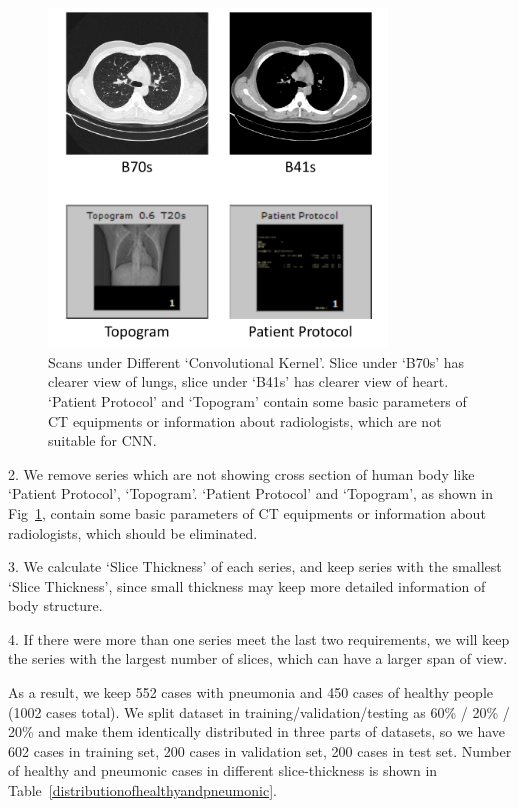 \documentclass[journal]{IEEEtran}
\begin{document}
\begin{figure}[t]
    \centerline{\includegraphics[width=90mm]{Bs.pdf}}
    \vspace{-0cm}
    \caption{Scans under Different `Convolutional Kernel'. Slice under `B70s' has clearer view of lungs, slice under `B41s' has clearer view of heart. `Patient Protocol' and `Topogram' contain some basic parameters of CT equipments or information about radiologists, which are not suitable for CNN.}
    \vspace{-0cm}
    \label{Bs}
    \end{figure}

2. We remove series which are not showing cross section of human body like `Patient Protocol', `Topogram'. `Patient Protocol' and `Topogram', as shown in Fig~\ref{Bs}, contain some basic parameters of CT equipments or information about radiologists, which should be eliminated.

3. We calculate `Slice Thickness' of each series, and keep series with the smallest `Slice Thickness', since small thickness may keep more detailed information of body structure. 

4. If there were more than one series meet the last two requirements, we will keep the series with the largest number of slices, which can have a larger span of view.

As a result, we keep 552 cases with pneumonia and 450 cases of healthy people (1002 cases total).
We split dataset in training/validation/testing as 60\% / 20\% / 20\% and make them identically distributed in three parts of datasets, so we have 602 cases in training set, 200 cases in validation set, 200 cases in test set.
Number of healthy and pneumonic cases in different slice-thickness is shown in Table~\ref{distributionofhealthyandpneumonic}.
\end{document}
